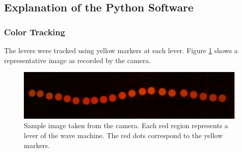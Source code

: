 \documentclass[12pt]{article}
\begin{document}
\subsection{Explanation of the Python Software}
\subsubsection{Color Tracking}
The levers were tracked using yellow markers at each lever. Figure \ref{fig:raw} shows a representative image as recorded by the camera. 

\begin{figure}[hbt]
  \includegraphics[width=.6\columnwidth]{analysis/data_analysis_sample_frame}
  \caption{Sample image taken from the camera. Each red region represents a lever of the wave machine. The red dots correspond to the yellow markers.}\label{fig:raw}
\end{figure}
\end{document}

